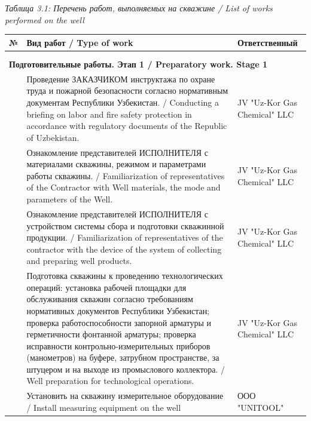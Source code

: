 \documentclass[11pt]{article}
\begin{document}
\vspace{0.4em}
\textit{Таблица 3.1: Перечень работ, выполняемых на скважине / List of works performed on the well}

\vspace{0.2em}
\noindent
\begin{longtable}{|p{}|p{}|p{}|}
\hline
\centering\textbf{№} & \centering\textbf{Вид работ / Type of work} & \centering\textbf{Ответственный}\arraybackslash \\
\hline
\centering 1 & \centering 2 & \centering 3 \arraybackslash \\
\hline
\endfirsthead
\hline
\centering 1 & \centering 2 & \centering 3 \arraybackslash \\
\hline
\endhead
\multicolumn{3}{|l|}{\textbf{Подготовительные работы. Этап 1 / Preparatory work. Stage 1}} \\
\hline
\centering 1 & Проведение ЗАКАЗЧИКОМ инструктажа по охране труда и пожарной безопасности согласно нормативным документам Республики Узбекистан. / Conducting a briefing on labor and fire safety protection in accordance with regulatory documents of the Republic of Uzbekistan. & JV "Uz-Kor Gas Chemical" LLC \\
\hline
\centering 2 & Ознакомление представителей ИСПОЛНИТЕЛЯ с материалами скважины, режимом и параметрами работы скважины. / Familiarization of representatives of the Contractor with Well materials, the mode and parameters of the Well. & JV "Uz-Kor Gas Chemical" LLC \\
\hline
\centering 3 & Ознакомление представителей ИСПОЛНИТЕЛЯ с устройством системы сбора и подготовки скважинной продукции. / Familiarization of representatives of the contractor with the device of the system of collecting and preparing well products. & JV "Uz-Kor Gas Chemical" LLC \\
\hline
\centering 4 & Подготовка скважины к проведению технологических операций: установка рабочей площадки для обслуживания скважин согласно требованиям нормативных документов Республики Узбекистан; проверка работоспособности запорной арматуры и герметичности фонтанной арматуры; проверка исправности контрольно-измерительных приборов (манометров) на буфере, затрубном пространстве, за штуцером и на выходе из промыслового коллектора. / Well preparation for technological operations. & JV "Uz-Kor Gas Chemical" LLC \\
\hline
\centering 5 & Установить на скважину измерительное оборудование / Install measuring equipment on the well & ООО "UNITOOL" \\

\end{longtable}
\end{document}
